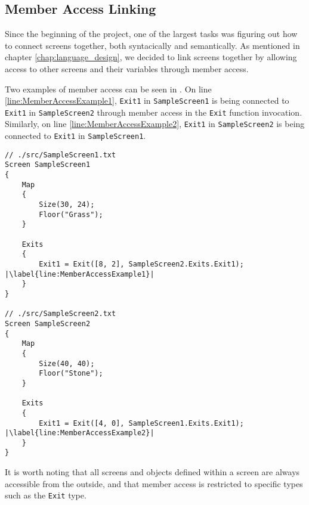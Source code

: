 \subsection*{Member Access Linking} \label{sec:Linker}
Since the beginning of the project, one of the largest tasks was figuring out how to connect screens together, both syntacically and semantically. 
As mentioned in chapter \ref{chap:language_design}, we decided to link screens together by allowing access to other screens and their variables through member access. 


Two examples of member access can be seen in . 
On line \ref{line:MemberAccessExample1}, \texttt{Exit1} in \texttt{SampleScreen1} is being connected to \texttt{Exit1} in \texttt{SampleScreen2} through member access in the \texttt{Exit} function invocation.
Similarly, on line \ref{line:MemberAccessExample2}, \texttt{Exit1} in \texttt{SampleScreen2} is being connected to \texttt{Exit1} in \texttt{SampleScreen1}.

\begin{lstlisting}[language=CSharp, caption={\dazel{} source code example of member access.}, label={lst:LinkingExample},escapechar=|]
// ./src/SampleScreen1.txt
Screen SampleScreen1 
{
	Map 
	{
		Size(30, 24);
		Floor("Grass");
	}
	
	Exits 
	{
		Exit1 = Exit([8, 2], SampleScreen2.Exits.Exit1); |\label{line:MemberAccessExample1}|
	}
}

// ./src/SampleScreen2.txt
Screen SampleScreen2
{
	Map 
	{
		Size(40, 40);
		Floor("Stone");
	}
	
	Exits 
	{
		Exit1 = Exit([4, 0], SampleScreen1.Exits.Exit1); |\label{line:MemberAccessExample2}|
	}
}
\end{lstlisting}

It is worth noting that all screens and objects defined within a screen are always accessible from the outside, and that member access is restricted to specific types such as the \texttt{Exit} type.
